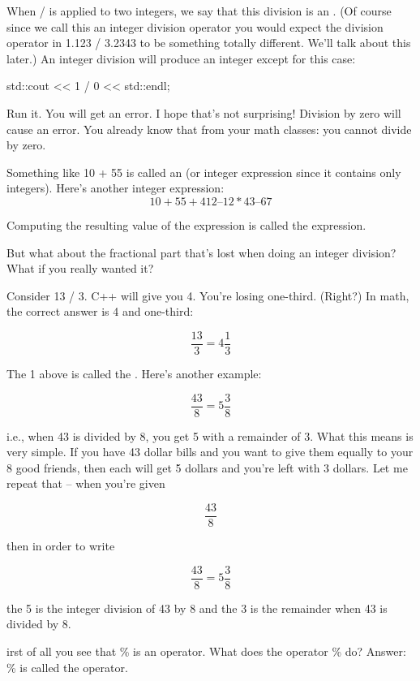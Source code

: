 
When / is applied to two integers, we say that this division is an
. (Of course since we call this an integer
division operator you would expect the division operator in 1.123 / 3.2343
to be something totally different. We'll talk about this later.)
An integer division will produce an integer except for this case:

\begin{console}
std::cout << 1 / 0 << std::endl;
\end{console}

Run it. You will get an error. I hope that's not surprising! Division by zero
will cause an error. You already know that from your math classes: you
cannot divide by zero.

%

Something like 10 + 55 is called an  (or integer
expression since it contains only integers). Here's another integer
expression:
\[ 10 + 55 + 412 – 12 * 43 – 67\]

Computing the resulting value of the expression is called
 the expression.

But what about the fractional part that's lost when doing an integer
division? What if you really wanted it?

Consider 13 / 3. C++ will give you 4. You're losing one-third. (Right?) In
math, the correct answer is 4 and one-third:

\[\frac{13}{3} = 4\frac{1}{3}\]

The 1 above is called the . Here's another example:

\[\frac{43}{8} = 5\frac{3}{8}\]

i.e., when 43 is divided by 8, you get 5 with a remainder of 3. What this
means is very simple. If you have 43 dollar bills and you want to give
them equally to your 8 good friends, then each will get 5 dollars and
you're left with 3 dollars. Let me repeat that – when you're given

\[\frac{43}{8}\]

then in order to write

\[\frac{43}{8} = 5\frac{3}{8}\]

the 5 is the integer division of 43 by 8 and the 3 is the remainder when
43 is divided by 8.

%

irst of all you see that \% is an operator. What does the operator \% do?
Answer: 
\% is called the  operator.

